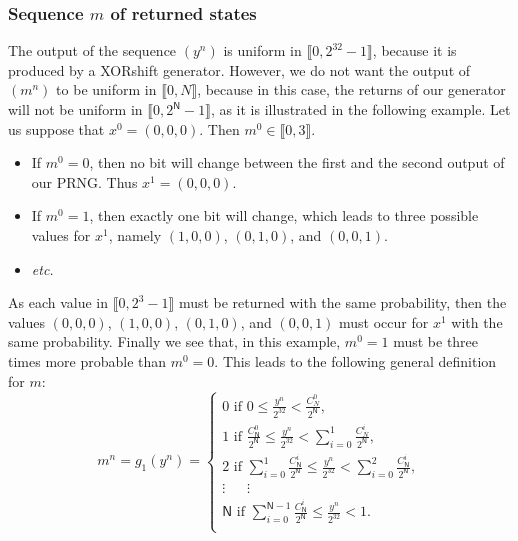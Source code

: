 \documentclass[journal]{IEEEtran}
\begin{document}
\subsubsection{Sequence $m$ of returned states}
\label{algo m}
The output of the sequence $(y^n)$ is uniform in $\llbracket 0, 2^{32}-1 \rrbracket$, because it is produced by a XORshift generator. However, we do not want the output of $(m^n)$ to be uniform in $\llbracket 0, N \rrbracket$, because in this case, the returns of our generator will not be uniform in $\llbracket 0, 2^{\mathsf{N}}-1 \rrbracket$, as it is illustrated in the following example. Let us suppose that $x^0=(0,0,0)$. Then $m^0 \in \llbracket 0, 3 \rrbracket$.
\begin{itemize}
\item If $m^0=0$, then no bit will change between the first and the second output of our PRNG. Thus $x^1 = (0,0,0)$.
\item If $m^0=1$, then exactly one bit will change, which leads to three possible values for $x^1$, namely $(1,0,0)$, $(0,1,0)$, and $(0,0,1)$.
\item \emph{etc.}
\end{itemize}
As each value in $\llbracket 0, 2^3-1 \rrbracket$ must be returned with the same probability, then the values $(0,0,0)$, $(1,0,0)$, $(0,1,0)$, and $(0,0,1)$ must occur for $x^1$ with the same probability. Finally we see that, in this example, $m^0=1$ must be three times more probable than $m^0=0$.
This leads to the following general definition for $m$:
\begin{equation}
\label{Formula}
m^n = g_1(y^n)=
\left\{
\begin{array}{l}
0 \text{ if }0 \leqslant\frac{y^n}{2^{32}}<\frac{C^0_N}{2^\mathsf{N}},\\
1 \text{ if }\frac{C^0_\mathsf{N}}{2^\mathsf{N}} \leqslant\frac{y^n}{2^{32}}<\sum_{i=0}^1\frac{C^i_N}{2^\mathsf{N}},\\
2 \text{ if }\sum_{i=0}^1\frac{C^i_\mathsf{N}}{2^\mathsf{N}} \leqslant\frac{y^n}{2^{32}}<\sum_{i=0}^2\frac{C^i_\mathsf{N}}{2^\mathsf{N}},\\
\vdots~~~~~ ~~\vdots~~~ ~~~~\\
\mathsf{N} \text{ if }\sum_{i=0}^{\mathsf{N}-1}\frac{C^i_\mathsf{N}}{2^\mathsf{N}} \leqslant\frac{y^n}{2^{32}}<1.\\
\end{array}
\right.
\end{equation}
\end{document}
